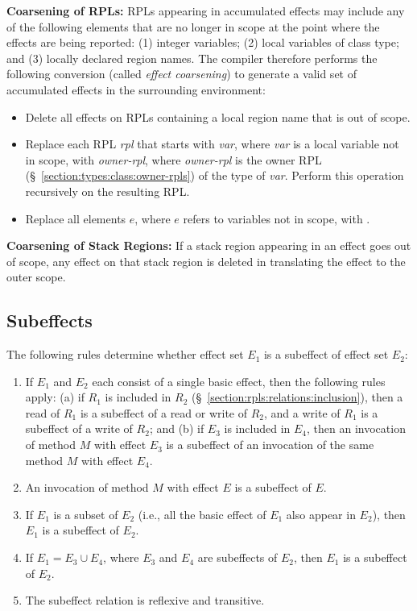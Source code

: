 \noindent
\textbf{Coarsening of RPLs:} RPLs appearing in accumulated effects may
include any of the following elements that are no longer in scope at
the point where the effects are being reported: (1) integer variables;
(2)  local variables of class type; and (3) locally
declared region names.  The compiler therefore performs the following
conversion (called \emph{effect coarsening}) to generate a valid set
of accumulated effects in the surrounding environment:
%
\begin{itemize}
%
\item Delete all effects on RPLs containing a local region name that
  is out of scope.
%
\item Replace each RPL \emph{rpl} that starts with \emph{var}, where
  \emph{var} is a  local variable not in scope, with
  \emph{owner-rpl}\kwd{:*}, where \emph{owner-rpl} is the owner RPL
  (\S~\ref{section:types:class:owner-rpls}) of the type of \emph{var}.
  Perform this operation recursively on the resulting RPL.
%
\item Replace all elements \kwd{[}$e$\kwd{]}, where $e$ refers to
  variables not in scope, with \kwd{[?]}.
%
\end{itemize}

\noindent
\textbf{Coarsening of Stack Regions:} If a stack region appearing in
an effect goes out of scope, any effect on that stack region is
deleted in translating the effect to the outer scope.

\subsection{Subeffects}
\label{section:effects:subeffects}

The following rules determine whether effect set $E_1$ is a subeffect of
effect set $E_2$:
%
\begin{enumerate}
%
\item If $E_1$ and $E_2$ each consist of a single basic effect, then
  the following rules apply: (a) if $R_1$ is included in $R_2$
  (\S~\ref{section:rpls:relations:inclusion}), then a read of $R_1$ is
  a subeffect of a read or write of $R_2$, and a write of $R_1$ is a
  subeffect of a write of $R_2$; and (b) if $E_3$ is included in
  $E_4$, then an invocation of method $M$ with effect $E_3$ is a
  subeffect of an invocation of the same method $M$ with effect $E_4$.
%
\item An invocation of method $M$ with effect $E$ is a subeffect of $E$.
%
\item If $E_1$ is a subset of $E_2$ (i.e., all the basic effect of
  $E_1$ also appear in $E_2$), then $E_1$ is a subeffect of $E_2$.
%
\item If $E_1 = E_3 \cup E_4$, where $E_3$ and $E_4$ are subeffects of
  $E_2$, then $E_1$ is a subeffect of $E_2$.
%
\item The subeffect relation is reflexive and transitive.
%
\end{enumerate}


